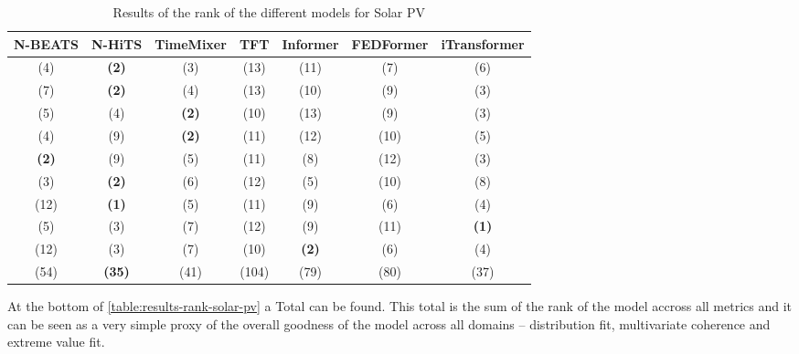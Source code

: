 \begin{table}[ht]
    \footnotesize
    \begin{flushright}
    \begin{tabular}[r]{|ccc|cccc}
        \toprule
        N-BEATS&N-HiTS&TimeMixer&TFT&Informer&FEDFormer&iTransformer \\
        \midrule            
        (4)&\textbf{(2)}&(3)&(13)&(11)&(7)&(6) \\
        (7)&\textbf{(2)}&(4)&(13)&(10)&(9)&(3) \\
        (5)&(4)&\textbf{(2)}&(10)&(13)&(9)&(3) \\
        \midrule
        (4)&(9)&\textbf{(2)}&(11)&(12)&(10)&(5) \\
        \textbf{(2)}&(9)&(5)&(11)&(8)&(12)&(3) \\
        (3)&\textbf{(2)}&(6)&(12)&(5)&(10)&(8) \\
        \midrule
        (12)&\textbf{(1)}&(5)&(11)&(9)&(6)&(4) \\
        (5)&(3)&(7)&(12)&(9)&(11)&\textbf{(1)} \\
        (12)&(3)&(7)&(10)&\textbf{(2)}&(6)&(4) \\
        \bottomrule
        (54)&\textbf{(35)}&(41)&(104)&(79)&(80)&(37) \\
        \bottomrule
    \end{tabular}
    \end{flushright}
    \caption{Results of the rank of the different models for Solar PV\label{long}}
    \label{table:results-rank-solar-pv}
\end{table}

At the bottom of \autoref{table:results-rank-solar-pv} a Total can be found. This total is the sum of the rank of the model accross all metrics and it can be seen as a very simple proxy of the overall goodness of the model across all domains -- distribution fit, multivariate coherence and extreme value fit. 


